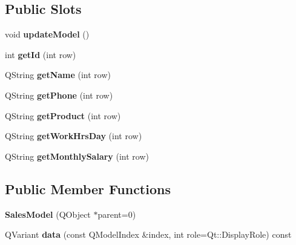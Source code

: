 \subsection*{Public Slots}
\begin{DoxyCompactItemize}
\item 
\mbox{\label{class_sales_model_a6947c5eb05b386ca7f09f318a3ae6230}} 
void {\bfseries update\+Model} ()
\item 
\mbox{\label{class_sales_model_a9f0f54cfc8b9f9d59ba61c133d99ce6f}} 
int {\bfseries get\+Id} (int row)
\item 
\mbox{\label{class_sales_model_a4d5cdac1aef9374008d6acd21a1d7881}} 
Q\+String {\bfseries get\+Name} (int row)
\item 
\mbox{\label{class_sales_model_ac80d9783d2cb2560f0374a60f989562a}} 
Q\+String {\bfseries get\+Phone} (int row)
\item 
\mbox{\label{class_sales_model_aca8ab7541d3b0c4f865bf1bcae2bff5e}} 
Q\+String {\bfseries get\+Product} (int row)
\item 
\mbox{\label{class_sales_model_ae1a76068ac6f4b8fd26c5e2fe1e41f57}} 
Q\+String {\bfseries get\+Work\+Hrs\+Day} (int row)
\item 
\mbox{\label{class_sales_model_adfe23e5bd369b7623586eb5dfe7c2a36}} 
Q\+String {\bfseries get\+Monthly\+Salary} (int row)
\end{DoxyCompactItemize}
\subsection*{Public Member Functions}
\begin{DoxyCompactItemize}
\item 
\mbox{\label{class_sales_model_a230673a20e616d4dcb993acbfe3426e1}} 
{\bfseries Sales\+Model} (Q\+Object $\ast$parent=0)
\item 
\mbox{\label{class_sales_model_ac6358cf833faababa04458a5cf45b421}} 
Q\+Variant {\bfseries data} (const Q\+Model\+Index \&index, int role=Qt\+::\+Display\+Role) const
\end{DoxyCompactItemize}
